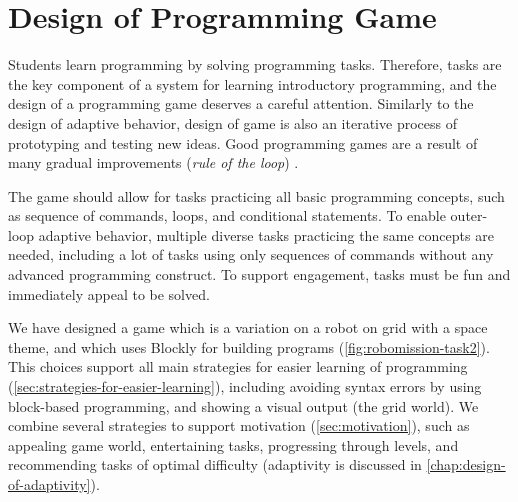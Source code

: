 \chapter{Design of Programming Game}
\label{chap:design-of-game}

Students learn programming by solving programming tasks.
Therefore, tasks are the key component of a system for learning introductory
programming, and the design of a programming game deserves a careful attention.
Similarly to the design of adaptive behavior, design of game is also an iterative
process of prototyping and testing new ideas.
Good programming games are a result of many gradual improvements
(\emph{rule of the loop}) \cite{book-of-lenses}.


The game should allow for tasks practicing all basic
programming concepts, such as sequence of commands, loops, and conditional
statements. %
To enable outer-loop adaptive behavior, multiple diverse tasks practicing the same
concepts are needed, including a lot of tasks using only sequences of commands
without any advanced programming construct.
To support engagement, tasks must be fun and immediately appeal to be
solved.  %


We have designed a game which is a variation on a robot
on grid with a space theme, and which uses Blockly for building programs
(\cref{fig:robomission-task2}).
This choices support all main strategies for easier learning of programming
(\cref{sec:strategies-for-easier-learning}),
including
avoiding syntax errors by using block-based programming, and
showing a visual output (the grid world).
We combine several strategies to support motivation (\cref{sec:motivation}),
such as appealing game world, entertaining tasks, progressing through levels,
and recommending tasks of optimal difficulty
(adaptivity is discussed in \cref{chap:design-of-adaptivity}).

